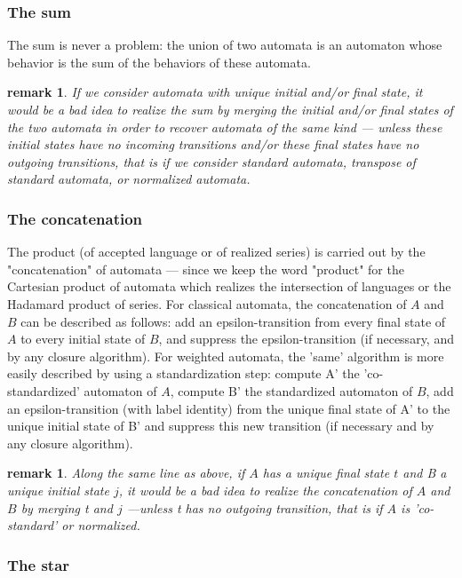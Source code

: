 \documentclass[a4paper]{report}
\newtheorem{remark}     [theorem]{remark}
\begin{document}
\subsubsection{The sum}

The sum is never a problem: the union of two automata is an automaton
whose behavior is the sum of the behaviors of these automata.

\begin{remark}
  If we consider automata with unique initial and/or final state, it
  would be a bad idea to realize the sum by merging the initial and/or
  final states of the two automata in order to recover automata of the
  same kind --- unless these initial states have no incoming
  transitions and/or these final states have no outgoing transitions,
  that is if we consider standard automata, transpose of standard
  automata, or normalized automata.
\end{remark}
\subsubsection{The concatenation}

The product (of accepted language or of realized series) is carried
out by the "concatenation" of automata --- since we keep the word
"product" for the Cartesian product of automata which realizes the
intersection of languages or the Hadamard product of series. For
classical automata, the concatenation of $A$ and $B$ can be described as
follows: add an epsilon-transition from every final state of $A$ to
every initial state of $B$, and suppress the epsilon-transition (if
necessary, and by any closure algorithm). For weighted automata, the
'same' algorithm is more easily described by using a standardization
step: compute A' the 'co-standardized' automaton of $A$, compute B' the
standardized automaton of $B$, add an epsilon-transition (with label
identity) from the unique final state of A' to the unique initial
state of B' and suppress this new transition (if necessary and by any
closure algorithm).

\begin{remark}
  Along the same line as above, if $A$ has a unique final state $t$ and
  B a unique initial state $j$, it would be a bad idea to realize the
  concatenation of $A$ and $B$ by merging t and $j$ ---unless t has no
  outgoing transition, that is if $A$ is 'co-standard' or normalized.
\end{remark}


\subsubsection{The star}
\end{document}
